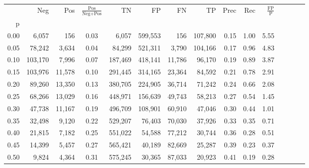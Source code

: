 \begin{tabular}{rrrcrrrrrrrrrrr}
\toprule
{} &      Neg &     Pos & $\frac{\text{Pos}}{\text{Neg}+\text{Pos}}$ &       TN &       FP &       FN &       TP &  Prec &   Rec & $\frac{\text{FP}}{\text{P}}$ \\
p    &          &         &                                            &          &          &          &          &       &       &                              \\
\midrule
0.00 &    6,057 &     156 &                                       0.03 &    6,057 &  599,553 &      156 &  107,800 &  0.15 &  1.00 &                         5.55 \\
0.05 &   78,242 &   3,634 &                                       0.04 &   84,299 &  521,311 &    3,790 &  104,166 &  0.17 &  0.96 &                         4.83 \\
0.10 &  103,170 &   7,996 &                                       0.07 &  187,469 &  418,141 &   11,786 &   96,170 &  0.19 &  0.89 &                         3.87 \\
0.15 &  103,976 &  11,578 &                                       0.10 &  291,445 &  314,165 &   23,364 &   84,592 &  0.21 &  0.78 &                         2.91 \\
0.20 &   89,260 &  13,350 &                                       0.13 &  380,705 &  224,905 &   36,714 &   71,242 &  0.24 &  0.66 &                         2.08 \\
0.25 &   68,266 &  13,029 &                                       0.16 &  448,971 &  156,639 &   49,743 &   58,213 &  0.27 &  0.54 &                         1.45 \\
0.30 &   47,738 &  11,167 &                                       0.19 &  496,709 &  108,901 &   60,910 &   47,046 &  0.30 &  0.44 &                         1.01 \\
0.35 &   32,498 &   9,120 &                                       0.22 &  529,207 &   76,403 &   70,030 &   37,926 &  0.33 &  0.35 &                         0.71 \\
0.40 &   21,815 &   7,182 &                                       0.25 &  551,022 &   54,588 &   77,212 &   30,744 &  0.36 &  0.28 &                         0.51 \\
0.45 &   14,399 &   5,457 &                                       0.27 &  565,421 &   40,189 &   82,669 &   25,287 &  0.39 &  0.23 &                         0.37 \\
0.50 &    9,824 &   4,364 &                                       0.31 &  575,245 &   30,365 &   87,033 &   20,923 &  0.41 &  0.19 &                         0.28 \\

\end{tabular}
